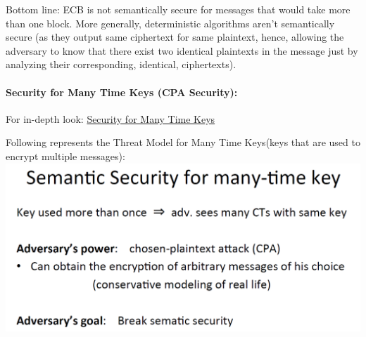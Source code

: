 \documentclass[11pt]{article}
\makeatletter
\def\maxwidth{\ifdim\Gin@nat@width>\linewidth\linewidth
    \else\Gin@nat@width\fi}
\let\Oldincludegraphics\includegraphics
\renewcommand{\includegraphics}[1]{\Oldincludegraphics[width=.8\maxwidth]{#1}}
\makeatother
\begin{document}
Bottom line: ECB is not semantically secure for messages that would take
more than one block. More generally, deterministic algorithms aren't
semantically secure (as they output same ciphertext for same plaintext,
hence, allowing the adversary to know that there exist two identical
plaintexts in the message just by analyzing their corresponding,
identical, ciphertexts).

\hypertarget{security-for-many-time-keys-cpa-security}{%
\paragraph{Security for Many Time Keys (CPA
Security):}\label{security-for-many-time-keys-cpa-security}}

For in-depth look:
\href{https://www.coursera.org/learn/crypto/lecture/1pnne/security-for-many-time-key-cpa-security}{Security
for Many Time Keys}

Following represents the Threat Model for Many Time Keys(keys that are
used to encrypt multiple messages):
\includegraphics{./Images/SSforManyTimeKeys.png}
\end{document}
